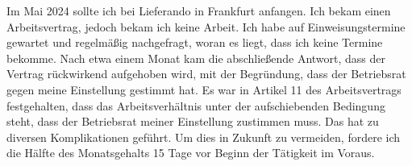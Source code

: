 		Im Mai 2024 sollte ich bei Lieferando in Frankfurt anfangen.
		Ich bekam einen Arbeitsvertrag, jedoch bekam ich keine Arbeit.
		Ich habe auf Einweisungstermine gewartet und regelmäßig nachgefragt, woran es liegt, dass ich keine Termine bekomme.
		Nach etwa einem Monat kam die abschließende Antwort, dass der Vertrag rückwirkend aufgehoben wird, mit der Begründung, dass der Betriebsrat gegen meine Einstellung gestimmt hat.
		Es war in Artikel 11 des Arbeitsvertrags festgehalten, dass das Arbeitsverhältnis unter der aufschiebenden Bedingung steht, dass der Betriebsrat meiner Einstellung zustimmen muss.
		Das hat zu diversen Komplikationen geführt.
		Um dies in Zukunft zu vermeiden, fordere ich die Hälfte des Monatsgehalts 15 Tage vor Beginn der Tätigkeit im Voraus.